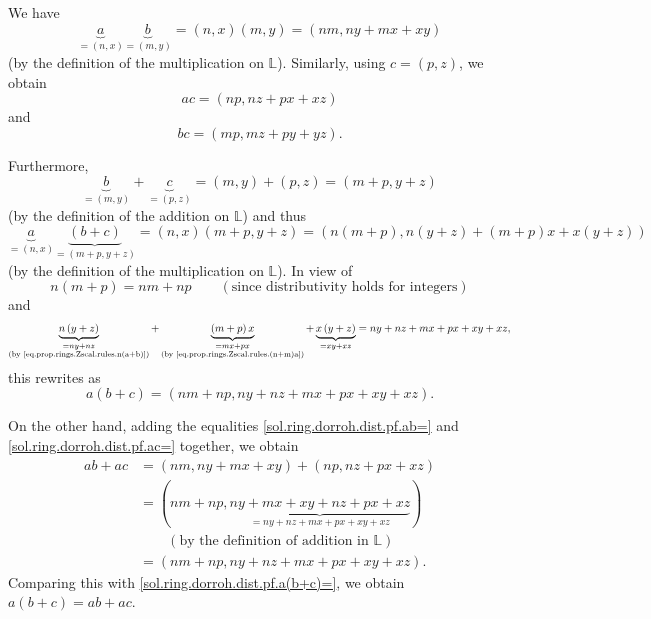 \documentclass[paper=a4, fontsize=12pt]{scrartcl}%
\theoremstyle{plainsl}
\theoremstyle{definition}
\theoremstyle{remark}
\begin{document}
We have
\begin{equation}
\underbrace{a}_{=\left(  n,x\right)  }\underbrace{b}_{=\left(  m,y\right)
}=\left(  n,x\right)  \left(  m,y\right)  =\left(  nm,ny+mx+xy\right)
\label{sol.ring.dorroh.dist.pf.ab=}%
\end{equation}
(by the definition of the multiplication on $\mathbb{L}$). Similarly, using
$c=\left(  p,z\right)  $, we obtain%
\begin{equation}
ac=\left(  np,nz+px+xz\right)  \label{sol.ring.dorroh.dist.pf.ac=}%
\end{equation}
and%
\begin{equation}
bc=\left(  mp,mz+py+yz\right)  . \label{sol.ring.dorroh.dist.pf.bc=}%
\end{equation}


Furthermore,%
\[
\underbrace{b}_{=\left(  m,y\right)  }+\underbrace{c}_{=\left(  p,z\right)
}=\left(  m,y\right)  +\left(  p,z\right)  =\left(  m+p,y+z\right)
\]
(by the definition of the addition on $\mathbb{L}$) and thus%
\[
\underbrace{a}_{=\left(  n,x\right)  }\underbrace{\left(  b+c\right)
}_{=\left(  m+p,y+z\right)  }=\left(  n,x\right)  \left(  m+p,y+z\right)
=\left(  n\left(  m+p\right)  ,n\left(  y+z\right)  +\left(  m+p\right)
x+x\left(  y+z\right)  \right)
\]
(by the definition of the multiplication on $\mathbb{L}$). In view of%
\[
n\left(  m+p\right)  =nm+np\qquad\left(  \text{since distributivity holds for
integers}\right)
\]
and%
\[
\underbrace{n\left(  y+z\right)  }_{\substack{=ny+nz\\\text{(by
\eqref{eq.prop.rings.Zscal.rules.n(a+b)})}}}+\underbrace{\left(  m+p\right)
x}_{\substack{=mx+px\\\text{(by \eqref{eq.prop.rings.Zscal.rules.(n+m)a})}%
}}+\underbrace{x\left(  y+z\right)  }_{=xy+xz}=ny+nz+mx+px+xy+xz,
\]
this rewrites as%
\begin{equation}
a\left(  b+c\right)  =\left(  nm+np,ny+nz+mx+px+xy+xz\right)  .
\label{sol.ring.dorroh.dist.pf.a(b+c)=}%
\end{equation}


On the other hand, adding the equalities \eqref{sol.ring.dorroh.dist.pf.ab=}
and \eqref{sol.ring.dorroh.dist.pf.ac=} together, we obtain%
\begin{align*}
ab+ac  &  =\left(  nm,ny+mx+xy\right)  +\left(  np,nz+px+xz\right) \\
&  =\left(  nm+np,\underbrace{ny+mx+xy+nz+px+xz}_{=ny+nz+mx+px+xy+xz}\right)
\\
&  \qquad\left(  \text{by the definition of addition in }\mathbb{L}\right) \\
&  =\left(  nm+np,ny+nz+mx+px+xy+xz\right)  .
\end{align*}
Comparing this with \eqref{sol.ring.dorroh.dist.pf.a(b+c)=}, we obtain
$a\left(  b+c\right)  =ab+ac$.
\end{document}

